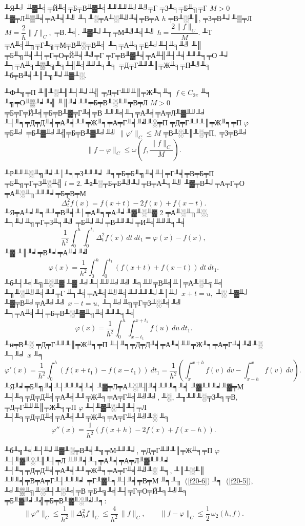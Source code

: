  ╨Я╨╛ ╨▓╨╡╤Й╨╡╤Б╤В╨▓╨╡╨╜╨╜╨╛╨╝╤Г ╤З╨╕╤Б╨╗╤Г $M>0$ ╨▓╤Л╨▒╨╡╤А╨╡╨╝ ╨┐╨░╤А╨░╨╝╨╡╤В╤А $h$ ╤В╨░╨║, ╤З╤В╨╛╨▒╤Л $M=\dfrac{2}{h}\|f\|_C,$
 ╤В.\,╨╡. ╨▓╨╛╨╖╤М╨╝╨╡╨╝ $h=\dfrac{2\|f\|_C}{M}.$ ╨Т ╤А╨╡╨╖╤Г╨╗╤М╤В╨░╤В╨╡ ╨┐╤А╨╕╤Е╨╛╨┤╨╕╨╝ ╨║ ╤Б╨╗╨╡╨┤╤Г╤О╤Й╨╡╨╝╤Г ╤Г╤В╨▓╨╡╤А╨╢╨┤╨╡╨╜╨╕╤О ╨╛ ╨┐╤А╨╕╨▒╨╗╨╕╨╢╨╡╨╜╨╕╨╕ ╤Д╤Г╨╜╨║╤Ж╨╕╤П╨╝╨╕ ╨б╤В╨╡╨║╨╗╨╛╨▓╨░.

 \begin{teo} ╨Ф╨╗╤П ╨║╨░╨╢╨┤╨╛╨╣ ╤Д╤Г╨╜╨║╤Ж╨╕╨╕ $f\in C_{{2\pi}}$ ╨╕ ╨╗╤О╨▒╨╛╨╣ ╨║╨╛╨╜╤Б╤В╨░╨╜╤В╤Л $M>0$ ╤Б╤Г╤Й╨╡╤Б╤В╨▓╤Г╨╡╤В
 ╨╜╨╡╨┐╤А╨╡╤А╤Л╨▓╨╜╨╛ ╨┤╨╕╤Д╤Д╨╡╤А╨╡╨╜╤Ж╨╕╤А╤Г╨╡╨╝╨░╤П ╤Д╤Г╨╜╨║╤Ж╨╕╤П $\varphi$ ╤Б╨╛ ╤Б╨▓╨╛╨╣╤Б╤В╨▓╨╛╨╝
 $\|\varphi'\|_C\le M$ ╤В╨░╨║╨░╤П,~╤З╤В╨╛
 $$
  \|f-\varphi\|_C\le \omega\left( f,\frac{\|f\|_C}{M}\right).
 $$
 \end{teo}

 ╨Р╨╜╨░╨╗╨╛╨│╨╕╤З╨╜╨╛ ╨╕╤Б╤Б╨╗╨╡╨┤╤Г╨╡╤В╤Б╤П ╤Б╨╗╤Г╤З╨░╨╣ $l=2.$
╨а╨░╤Б╤Б╨╝╨╛╤В╤А╨╕╨╝ ╨▓╤В╨╛╤А╤Г╤О ╤А╨░╨╖╨╜╨╛╤Б╤В╤М
   $$
 \Delta_t^2 f(x)=f(x+t)-2f(x)+f(x-t).
 $$
 ╨Я╤А╨╛╨╕╨╜╤В╨╡╨│╤А╨╕╤А╨╛╨▓╨░╨▓ 2 ╤А╨░╨╖╨░, ╨┐╨╛╨╗╤Г╤З╨╕╨╝ ╤Б╨╛╨╛╤В╨╜╨╛╤И╨╡╨╜╨╕╨╡
  \begin{equation}\label{f20-5}
 \frac{1}{h^2}\int_0^{h}\int_0^{t_1} \Delta_t^2 f(x)\, dt\
 dt_1=\varphi(x)-f(x),
 \end{equation}
 ╨▓ ╨║╨╛╤В╨╛╤А╨╛╨╝
  \begin{equation}\label{f20-5a}
 \varphi(x)=\frac{1}{h^2}\int_0^{h}\int_0^{t_1} (f(x+t)+f(x-t))\, dt\
 dt_1.
  \end{equation}
 ╨б╨┤╨╡╨╗╨░╨▓ ╨▓ ╨╛╨┤╨╜╨╛╨╝ ╨╕╨╜╤В╨╡╨│╤А╨░╨╗╨╡ ╨╖╨░╨╝╨╡╨╜╤Г ╨┐╨╡╤А╨╡╨╝╨╡╨╜╨╜╨╛╨│╨╛ $x+t=u,$ ╨░ ╨▓╨╛ ╨▓╤В╨╛╤А╨╛╨╝ $x-t=u,$ ╨┐╨╛╨╗╤Г╤З╨░╨╡╨╝ ╨┐╤А╨╡╨┤╤Б╤В╨░╨▓╨╗╨╡╨╜╨╕╨╡
 $$
 \varphi(x)=\frac{1}{h^2}\int_0^{h}\int_{x-t_1}^{x+t_1} f(u)\ du\  dt_1.
 $$
 ╨н╤В╨░ ╤Д╤Г╨╜╨║╤Ж╨╕╤П ╨┤╨╕╤Д╤Д╨╡╤А╨╡╨╜╤Ж╨╕╤А╤Г╨╡╨╝╨░ ╨┐╨╛ $x$ ╨╕
 $$
 \varphi'(x)=\frac{1}{h^2}\int_0^{h}(f(x+t_1)-f(x-t_1))\  dt_1=\frac{1}{h^2}\left(\int_x^{x+h}f(v)\ dv-\int_{x-h}^{x}f(v)\ dv\right).
 $$
╨Я╨╛╤Б╨╗╨╡╨┤╨╜╨╡╨╡ ╨▓╤Л╤А╨░╨╢╨╡╨╜╨╕╨╡ ╨▓╨╜╨╛╨▓╤М ╨┤╨╕╤Д╤Д╨╡╤А╨╡╨╜╤Ж╨╕╤А╤Г╨╡╨╝╨╛, ╨░, ╨╖╨╜╨░╤З╨╕╤В, ╤Д╤Г╨╜╨║╤Ж╨╕╤П $\varphi$ ╨┤╨▓╨░╨╢╨┤╤Л
╨┤╨╕╤Д╤Д╨╡╤А╨╡╨╜╤Ж╨╕╤А╤Г╨╡╨╝╨░ ╨╕
 \begin{equation}\label{f20-6}
 \varphi''(x)=\frac{1}{h^2}\left(f(x+h)-2f(x)+f(x-h)\right).
\end{equation}

╨б╨╗╨╡╨┤╨╛╨▓╨░╤В╨╡╨╗╤М╨╜╨╛, ╤Д╤Г╨╜╨║╤Ж╨╕╤П $\varphi$ ╨┤╨▓╨░╨╢╨┤╤Л ╨╜╨╡╨┐╤А╨╡╤А╤Л╨▓╨╜╨╛ ╨┤╨╕╤Д╤Д╨╡╤А╨╡╨╜╤Ж╨╕╤А╤Г╨╡╨╝╨░ ╨╕, ╨║╨░╨║ ╨╜╨╡╤В╤А╤Г╨┤╨╜╨╛
╤Г╨▓╨╕╨┤╨╡╤В╤М ╨╕╨╖~(\ref{f20-6}) ╨╕~(\ref{f20-5}), ╨╛╨▒╨╗╨░╨┤╨░╨╡╤В ╤Б╨╗╨╡╨┤╤Г╤О╤Й╨╕╨╝╨╕ ╤Б╨▓╨╛╨╣╤Б╤В╨▓╨░╨╝╨╕:
 \begin{equation}\label{f20-7}
 \|\varphi''\|_C\le \frac{1}{h^2} \|\Delta_h^2 f\|_C\le\frac{4}{h^2}\,\|f\|_C,\qquad
 \|f-\varphi\|_C\le \frac{1}{2}\,\omega_2(h,f).
 \end{equation}

